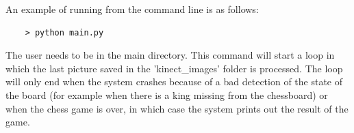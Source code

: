 \documentclass{l4proj}
\begin{document}
\begin{appendices}
An example of running from the command line is as follows:
\begin{verbatim}
	> python main.py
\end{verbatim}

The user needs to be in the main directory. This command will start a loop in which the last picture saved in the 'kinect\_images' folder is processed. The loop will only end when the system crashes because of a bad detection of the state of the board (for example when there is a king missing from the chessboard) or when the chess game is over, in which case the system prints out the result of the game.

\end{appendices}




\end{document}
